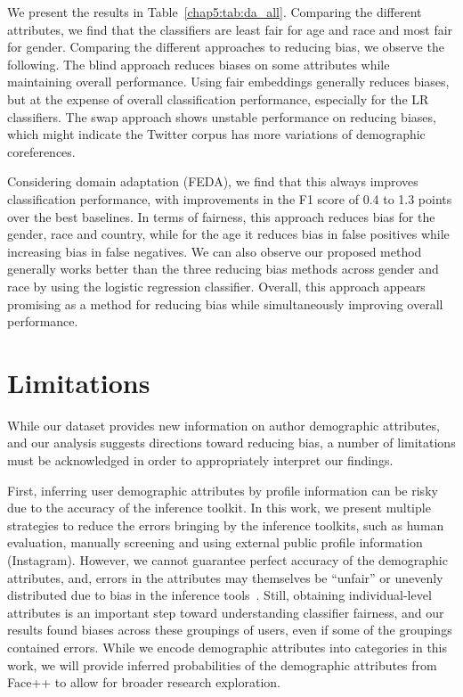 We present the results in Table~\ref{chap5:tab:da_all}.
Comparing the different attributes, we find that the classifiers are least fair for age and race and most fair for gender.
Comparing the different approaches to reducing bias, we observe the following.
The blind approach reduces biases on some attributes while maintaining overall performance.
Using fair embeddings generally reduces biases, but at the expense of overall classification performance, especially for the LR classifiers.
The swap approach shows unstable performance on reducing biases, which might indicate the Twitter corpus has more variations of demographic coreferences.


Considering domain adaptation (FEDA),
we find that this always improves classification performance,
with improvements in the F1 score of 0.4 to 1.3 points over the best baselines.
In terms of fairness, this approach reduces bias for the gender, race and country, while for the age it reduces bias in false positives while increasing bias in false negatives.
We can also observe our proposed method generally works better than the three reducing bias methods across gender and race by using the logistic regression classifier.
Overall, this approach appears promising as a method for reducing bias while simultaneously improving overall performance.

\section{Limitations}
While our dataset provides new information on author demographic attributes, and our analysis suggests directions toward reducing bias, a number of limitations must be acknowledged in order to appropriately interpret our findings.

First, inferring user demographic attributes by profile information can be risky due to the accuracy of the inference toolkit.
In this work, we present multiple strategies to reduce the errors bringing by the inference toolkits, such as human evaluation, manually screening and using external public profile information (Instagram).
However, we cannot guarantee perfect accuracy of the demographic attributes,
and, errors in the attributes may themselves be ``unfair'' or unevenly distributed due to bias in the inference tools~\cite{buolamwini2018gender}.
Still, obtaining individual-level attributes is an important step toward understanding classifier fairness, and our results found biases across these groupings of users, even if some of the groupings contained errors.
While we encode demographic attributes into categories in this work, 
we will provide inferred probabilities of the demographic attributes from Face++ to allow for broader research exploration.

